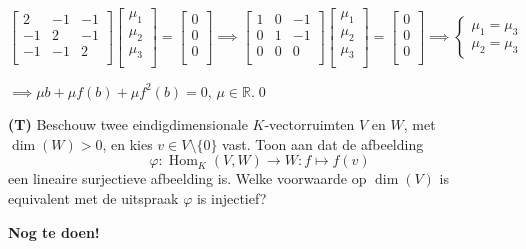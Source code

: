 \begin{oefening}[3.2.4]
\begin{enumerate}
        \(\begin{bmatrix}
            2 & -1 & -1 \\
            -1 & 2 & -1 \\
            -1 & -1 & 2 \\
        \end{bmatrix}
        \begin{bmatrix}
            \mu_1 \\
            \mu_2\\
            \mu_3\\
        \end{bmatrix}
        = \begin{bmatrix}
            0 \\
            0\\
            0\\
        \end{bmatrix}
        \implies
        \begin{bmatrix}
            1 & 0 & -1 \\
            0 & 1 & -1 \\
            0 & 0 & 0 \\
        \end{bmatrix}
        \begin{bmatrix}
            \mu_1 \\
            \mu_2\\
            \mu_3\\
        \end{bmatrix}
        = \begin{bmatrix}
            0 \\
            0\\
            0\\
        \end{bmatrix}
        \implies
        \begin{cases}
            \mu_1 = \mu_3 \\
            \mu_2 = \mu_3
        \end{cases}\)

        \(
        \implies \mu b + \mu f(b) + \mu f^2(b) = 0, \, \mu \in \mathds{R}.
        \)\qed
    \end{enumerate}
\end{oefening}

\begin{oefening}[3.4.5] \textbf{(T)}
    Beschouw twee eindigdimensionale $K$-vectorruimten $V$ en $W$, met $\dim(W) > 0$, en kies $v \in V \setminus \{0\}$ vast. Toon aan dat de afbeelding
    \[ \varphi \colon \operatorname{Hom}_K(V, W) \to W \colon f \mapsto f(v) \]
    een lineaire surjectieve afbeelding is. Welke voorwaarde op $\dim(V)$ is equivalent met de uitspraak $\varphi$ is injectief?

    \textbf{Nog te doen!}

\end{oefening}

